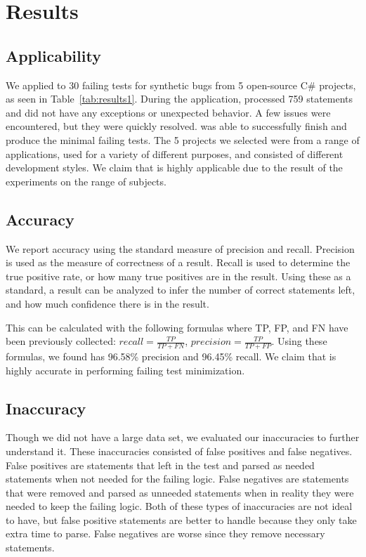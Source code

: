 \clearpage %

\chapter{Results}\label{CH6_Results}

\section{Applicability}
We applied \mytool to 30 failing tests for synthetic bugs from 5 open-source C\# projects, as seen in Table~\ref{tab:results1}. During the application, \mytool processed 759 statements and did not have any exceptions or unexpected behavior. A few issues were encountered, but they were quickly resolved. \mytool was able to successfully finish and produce the minimal failing tests. The 5 projects we selected were from a range of applications, used for a variety of different purposes, and consisted of different development styles. We claim that \mytool is highly applicable due to the result of the experiments on the range of subjects.

\section{Accuracy}
We report accuracy using the standard measure of precision and recall. Precision is used as the measure of correctness of a result. Recall is used to determine the true positive rate, or how many true positives are in the result. Using these as a standard, a result can be analyzed to infer the number of correct statements left, and how much confidence there is in the result. 

This can be calculated with the following formulas where TP, FP, and FN have been previously collected: $recall = \frac{TP}{TP + FN}$, $precision = \frac{TP}{TP+FP}$. Using these formulas, we found \mytool has 96.58\% precision and 96.45\% recall. We claim that \mytool is highly accurate in performing failing test minimization. 

\section{Inaccuracy}
Though we did not have a large data set, we evaluated our inaccuracies to further understand it. These inaccuracies consisted of false positives and false negatives. False positives are statements that \mytool left in the test and parsed as needed statements when not needed for the failing logic. False negatives are statements that were removed and parsed as unneeded statements when in reality they were needed to keep the failing logic. Both of these types of inaccuracies are not ideal to have, but false positive statements are better to handle because they only take extra time to parse. False negatives are worse since they remove necessary statements.

